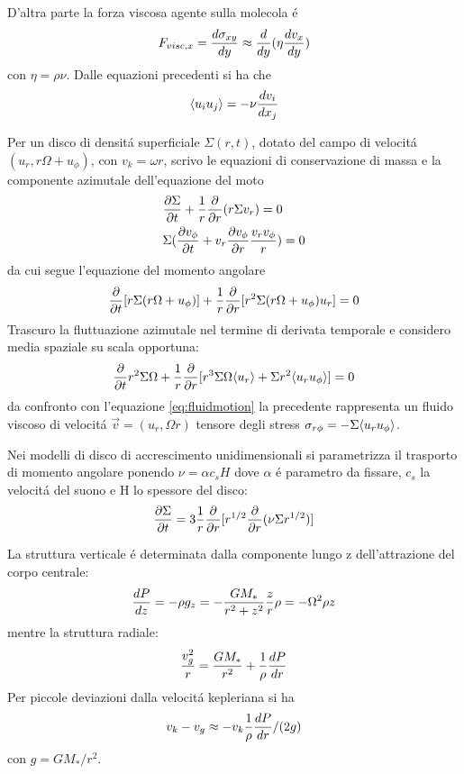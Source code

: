D'altra parte la forza viscosa agente sulla molecola \'e
\begin{equation}
F_{visc,x}=\TDy{y}{\sigma_{xy}}\approx\TDof{y}(\eta\TDy{y}{v_x})
\end{equation}
con $\eta=\rho\nu$.
Dalle equazioni precedenti si ha che
\begin{equation}
\exv{u_iu_j}=-\nu\TDy{x_j}{v_i}
\end{equation}

Per un disco di densit\'a superficiale $\Sigma(r,t)$, dotato del campo di velocit\'a $(u_r,r\Omega+u_{\phi})$, con $v_k=\omega r$, scrivo le equazioni di conservazione di massa e la componente azimutale dell'equazione del moto
\begin{align}
&\PDy{t}{\Sigma}+\frac{1}{r}\PDof{r}(r\Sigma v_r)=0\\
&\Sigma(\PDy{t}{v_{\phi}}+v_r\PDy{r}{v_{\phi}}\frac{v_rv_{\phi}}{r})=0
\end{align}
da cui segue l'equazione del momento angolare
\begin{equation}
\PDof{t}[r\Sigma(r\Omega+u_{\phi})]+\frac{1}{r}\PDof{r}[r^2\Sigma(r\Omega+u_{\phi})u_r]=0
\end{equation}
Trascuro la fluttuazione azimutale nel termine di derivata temporale e considero media spaziale su scala opportuna:
\begin{equation}
\PDof{t}r^2\Sigma\Omega+\frac{1}{r}\PDof{r}[r^3\Sigma\Omega\exv{u_r}+\Sigma r^2\exv{u_ru_{\phi}}]=0
\end{equation}
da confronto con l'equazione \eqref{eq:fluidmotion} la precedente rappresenta un fluido viscoso di velocit\'a $\vec{v}=(u_r,\Omega r)$ tensore degli stress $\sigma_{r\phi}=-\Sigma\exv{u_ru_{\phi}}$.

Nei modelli di disco di accrescimento unidimensionali si parametrizza il trasporto di momento angolare ponendo $\nu=\alpha c_s H$ dove $\alpha$ \'e parametro da fissare, $c_s$ la velocit\'a del suono e H lo spessore del disco:
\begin{equation}
\PDy{t}{\Sigma}=3\frac{1}{r}\PDof{r}[r\expy{1/2}\PDof{r}(\nu\Sigma r\expy{1/2})]\label{eq:sigmaevol}
\end{equation}

La struttura verticale \'e determinata dalla componente lungo z dell'attrazione del corpo centrale:
\begin{equation}
\TDy{z}{P}=-\rho g_z=-\frac{GM_*}{r^2+z^2}\frac{z}{r}\rho=-\Omega^2\rho z
\end{equation}
mentre la struttura radiale:
\begin{equation}
\frac{v_g^2}{r}=\frac{GM_*}{r^2}+\frac{1}{\rho}\TDy{r}{P}
\end{equation}
Per piccole deviazioni dalla velocit\'a kepleriana si ha
\begin{equation}
v_k-v_g\approx -v_k\frac{1}{\rho}\TDy{r}{P}/(2g)\label{eq:velocitykg}
\end{equation}
con $g=GM_*/r^2$.

